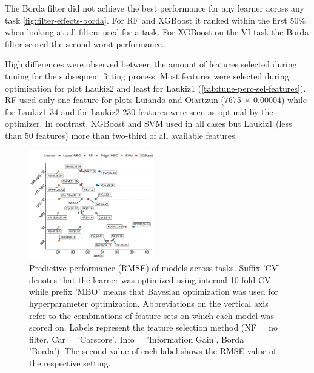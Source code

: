 \documentclass[letterpaper, peerreview, draftcls]{IEEEtran}
\begin{document}
The Borda filter did not achieve the best performance for any learner across any task \autoref{fig:filter-effects-borda}.
For RF and XGBoost it ranked within the first 50\% when looking at all filters used for a task.
For XGBoost on the VI task the Borda filter scored the second worst performance.

High differences were observed between the amount of features selected during tuning for the subsequent fitting process.
Most features were selected during optimization for plot Laukiz2 and least for Laukiz1 (\autoref{tab:tune-perc-sel-features}).
RF used only one feature for plots Luiando and Oiartzun (7675 $\times$ 0.00004) while for Laukiz1 34 and for Laukiz2 230 features were seen as optimal by the optimizer.
In contrast, XGBoost and SVM used in all cases but Laukiz1 (less than 50 features) more than two-third of all available features.











\begin{figure} [t!]
	\centering
	\begin{center}
		\includegraphics[width=0.48\textwidth] {performance-results-1.pdf}
		\caption{Predictive performance (RMSE) of models across tasks. Suffix 'CV' denotes that the learner was optimized using internal 10-fold CV while prefix 'MBO' means that Bayesian optimization was used for hyperparameter optimization. Abbreviations on the vertical axis refer to the combinations of feature sets on which each model was scored on. Labels represent the feature selection method (NF = no filter, Car = 'Carscore', Info = 'Information Gain', Borda = 'Borda'). The second value of each label shows the RMSE value of the respective setting.}\label{fig:perf-result}
	\end{center}
\end{figure}
\end{document}
